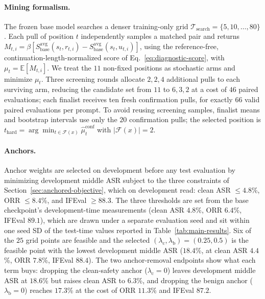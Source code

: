 \documentclass[11pt]{article}
\newcommand{\asr}{ASR}
\newcommand{\orr}{ORR}
\newcommand{\Savg}[1]{S^{\mathrm{avg}}_{#1}}
\begin{document}
\paragraph{Mining formalism.}
The frozen base model searches a denser training-only grid
\(\mathcal{T}_{\mathrm{search}}=\{5,10,\ldots,80\}\). Each pull of position
\(t\) independently samples a matched pair and returns
\(M_{t,i}=\beta[\Savg{\mathrm{base}}(s_t,r_{t,i})
-\Savg{\mathrm{base}}(s_t,u_{t,i})]\), using the reference-free,
continuation-length-normalized score of Eq.~\eqref{eq:diagnostic-score}, with
\(\mu_t=\mathbb{E}[M_{t,i}]\). We treat the \(11\) non-fixed positions as
stochastic arms and minimize \(\mu_t\). Three screening rounds allocate
\(2,2,4\) additional pulls to each surviving arm, reducing the candidate set
from \(11\) to \(6,3,2\) at a cost of \(46\) paired evaluations; each finalist
receives ten fresh confirmation pulls, for exactly \(66\) valid paired
evaluations per prompt. To avoid reusing screening samples, finalist means and
bootstrap intervals use only the \(20\) confirmation pulls; the selected
position is \(t_{\mathrm{hard}}=\arg\min_{t\in\mathcal{F}(x)}
\hat\mu^{\mathrm{conf}}_t\) with \(|\mathcal{F}(x)|=2\).

\paragraph{Anchors.}
Anchor weights are selected on development before any test evaluation by
minimizing development middle \asr{} subject to the three constraints of
Section~\ref{sec:anchored-objective}, which on development read: clean \asr{}
\(\leq 4.8\)\%, \orr{} \(\leq 8.4\)\%, and IFEval \(\geq 88.3\). The three
thresholds are set from the base checkpoint's development-time measurements
(clean \asr{} \(4.8\)\%, \orr{} \(6.4\)\%, IFEval \(89.1\)), which are drawn
under a separate evaluation seed and sit within one seed SD of the test-time
values reported in Table~\ref{tab:main-results}. Six of the \(25\)
grid points are feasible and the selected
\((\lambda_{\mathrm{c}},\lambda_{\mathrm{b}})=(0.25,0.5)\) is the feasible
point with the lowest development middle \asr{} (\(18.4\)\%, at clean \asr{}
\(4.4\)\%, \orr{} \(7.8\)\%, IFEval \(88.4\)). The two anchor-removal
endpoints show what each term buys: dropping the clean-safety anchor
(\(\lambda_{\mathrm{c}}{=}0\)) leaves development middle \asr{} at \(18.6\)\%
but raises clean \asr{} to \(6.3\)\%, and dropping the benign anchor
(\(\lambda_{\mathrm{b}}{=}0\)) reaches \(17.3\)\% at the cost of \orr{}
\(11.3\)\% and IFEval \(87.2\).
\end{document}
